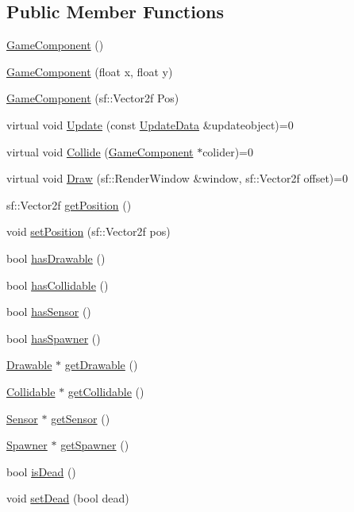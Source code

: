 \subsection*{Public Member Functions}
\begin{DoxyCompactItemize}
\item 
\hyperlink{class_game_component_a7109f4539ef3d4e92868298df54b7ecd}{Game\-Component} ()
\item 
\hyperlink{class_game_component_ac1eefc88d46d10f869939a7bab5a498b}{Game\-Component} (float x, float y)
\item 
\hyperlink{class_game_component_a3338305ddce8cb75296ba23e1c29cf0f}{Game\-Component} (sf\-::\-Vector2f Pos)
\item 
virtual void \hyperlink{class_game_component_af4ff61bad044ac587cf2f066d5b4afa0}{Update} (const \hyperlink{class_update_data}{Update\-Data} \&updateobject)=0
\item 
virtual void \hyperlink{class_game_component_a333932780a30df552333d02669c593bc}{Collide} (\hyperlink{class_game_component}{Game\-Component} $\ast$colider)=0
\item 
virtual void \hyperlink{class_game_component_a63c3e40531340490712b789d0d821743}{Draw} (sf\-::\-Render\-Window \&window, sf\-::\-Vector2f offset)=0
\item 
sf\-::\-Vector2f \hyperlink{class_game_component_a6af46404f1244c38687bb60ffc3644e5}{get\-Position} ()
\item 
void \hyperlink{class_game_component_a5c8aab42cfcc1f683584dd0434e2839d}{set\-Position} (sf\-::\-Vector2f pos)
\item 
bool \hyperlink{class_game_component_ae5a83de3b78cc5ce0f43316dd45de20d}{has\-Drawable} ()
\item 
bool \hyperlink{class_game_component_a8595ee50d296557bcf1af3ba5283c311}{has\-Collidable} ()
\item 
bool \hyperlink{class_game_component_af61ba1bd218ff2aca92443c89375c222}{has\-Sensor} ()
\item 
bool \hyperlink{class_game_component_ae6e938bb93586ad8820316368065c174}{has\-Spawner} ()
\item 
\hyperlink{class_drawable}{Drawable} $\ast$ \hyperlink{class_game_component_a6b5db3e878b861296d6cc3a0f4ee6528}{get\-Drawable} ()
\item 
\hyperlink{class_collidable}{Collidable} $\ast$ \hyperlink{class_game_component_a09eae8038373202d058179080643f75b}{get\-Collidable} ()
\item 
\hyperlink{class_sensor}{Sensor} $\ast$ \hyperlink{class_game_component_afca864b925be82f9c54711c75dc7be12}{get\-Sensor} ()
\item 
\hyperlink{class_spawner}{Spawner} $\ast$ \hyperlink{class_game_component_ab6db9e2e5f501ca360b08a7fc6a19644}{get\-Spawner} ()
\item 
bool \hyperlink{class_game_component_a12e49eab60da094bf8731f065bfafc71}{is\-Dead} ()
\item 
void \hyperlink{class_game_component_aa5e79bc4a1927f039ce345daa1a084c5}{set\-Dead} (bool dead)
\end{DoxyCompactItemize}
